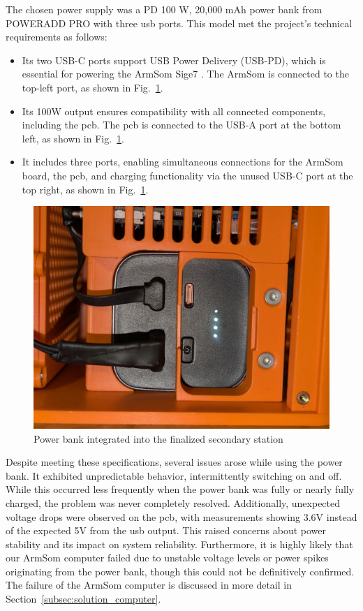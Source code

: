 The chosen power supply was a PD 100 W, 20,000 mAh power bank from POWERADD PRO \cite{poweradd_pro_powerbank} with three \acrfull{usb} ports. This model met the project's technical requirements as follows:
\begin{itemize}
	\item Its two USB-C ports support USB Power Delivery (USB-PD), which is essential for powering the ArmSom Sige7 \cite{armsom_sige7}. The ArmSom is connected to the top-left port, as shown in Fig.~\ref{fig:powerbank}.
	\item Its 100W output ensures compatibility with all connected components, including the \acrshort{pcb}. The \acrshort{pcb} is connected to the USB-A port at the bottom left, as shown in Fig.~\ref{fig:powerbank}.
	\item It includes three ports, enabling simultaneous connections for the ArmSom board, the \acrshort{pcb}, and charging functionality via the unused USB-C port at the top right, as shown in Fig.~\ref{fig:powerbank}.
\end{itemize}

\begin{figure}[H]
	\centering
	\includegraphics[width=1.0\linewidth]{figures/powerbank}
	\caption{Power bank integrated into the finalized secondary station}
	\label{fig:powerbank}
\end{figure}

Despite meeting these specifications, several issues arose while using the power bank. It exhibited unpredictable behavior, intermittently switching on and off. While this occurred less frequently when the power bank was fully or nearly fully charged, the problem was never completely resolved. Additionally, unexpected voltage drops were observed on the \acrshort{pcb}, with measurements showing 3.6V instead of the expected 5V from the \acrshort{usb} output. This raised concerns about power stability and its impact on system reliability. Furthermore, it is highly likely that our ArmSom computer \cite{armsom_sige7} failed due to unstable voltage levels or power spikes originating from the power bank, though this could not be definitively confirmed. The failure of the ArmSom computer is discussed in more detail in Section~\ref{subsec:solution_computer}.

